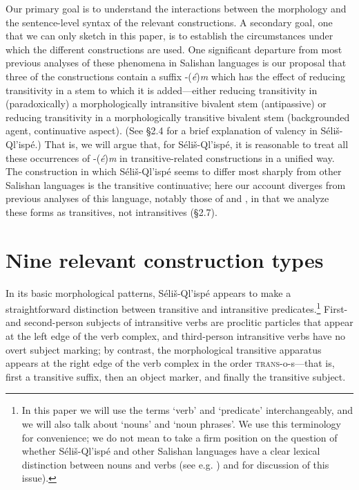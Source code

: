 \documentclass[output=paper,colorlinks,citecolor=brown]{langscibook}
\begin{document}
  Our primary goal is to understand the interactions between the
  morphology and the sentence-level syntax of the relevant
  constructions.  A secondary goal, one that we can only sketch in
  this paper, is to establish the circumstances under which the
  different constructions are used.  One significant departure from
  most previous analyses of these phenomena in Salishan languages is
  our proposal that three of the constructions contain a suffix
  -(\emph{\'e})\emph{m} which has the effect of reducing transitivity
  in a stem to which it is added---either reducing transitivity in
  (paradoxically) a morphologically intransitive bivalent stem
  (antipassive) or reducing transitivity in a morphologically
  transitive bivalent stem (backgrounded agent, continuative aspect).
  (See \S 2.4 for a brief explanation of valency in
  S\'eli\v{s}-Ql'isp\'e.) That is, we will argue that, for
  S\'eli\v{s}-Ql'isp\'e, it is reasonable to treat all these
  occurrences of -(\emph{\'e})\emph{m} in transitive-related
  constructions in a unified way.  The construction in which
  S\'eli\v{s}-Ql'isp\'e seems to differ most sharply from other
  Salishan languages is the transitive continuative; here our account
  diverges from previous analyses of this language, notably those of
  \cite{Kroeber:1999} and \cite{Vogt:1940}, in
  that we analyze these
  forms as transitives, not intransitives (\S 2.7).

\section{Nine relevant construction types}

In its basic morphological patterns, S\'eli\v{s}-Ql'isp\'e appears to
make a straightforward distinction between transitive and intransitive
predicates.\footnote{In this paper we will use the terms `verb' and
`predicate' interchangeably, and we will also talk about `nouns' and
`noun phrases'.  We use this terminology for convenience; we do not
mean to take a firm position on the question of whether
S\'eli\v{s}-Ql'isp\'e and other Salishan languages have a clear
lexical distinction between nouns and verbs (see e.g. \cite{Kinkade:1983}) and
\cite{vanEijk&Hess:1986} for discussion of this issue).}  First- and
second-person subjects of intransitive verbs are proclitic particles
that appear at the left edge of the verb complex, and third-person
intransitive verbs have no overt subject marking; by contrast, the
morphological transitive apparatus appears at the right edge of the
verb complex in the order \textsc{trans}-o-s---that is, first a
transitive suffix, then an object marker, and finally the transitive
subject.
\end{document}
